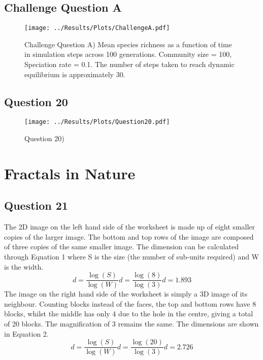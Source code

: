 \documentclass[12pt]{article}
\begin{document}
    \subsection{Challenge Question A}
	\begin{figure}[H]
		\centering
		\texttt{[image: ../Results/Plots/ChallengeA.pdf]}
		\caption{Challenge Question A) Mean species richness as a function of time in simulation steps across 100 generations. Community size = 100, Speciation rate = 0.1. The number of steps taken to reach dynamic equilibrium is approximately 30.}
	\end{figure}

    \subsection{Question 20}
	\begin{figure}[H]
		\centering
		\texttt{[image: ../Results/Plots/Question20.pdf]}
		\caption{Question 20)}
	\end{figure}
	
	\section{Fractals in Nature}
	\subsection{Question 21}
	The 2D image on the left hand side of the worksheet is made up of eight smaller copies of the larger image. The bottom and top rows of the image are composed of three copies of the same smaller image. The dimension can be calculated through Equation 1 where S is the size (the number of sub-units required) and W is the width. 
    \begin{equation}
    	 d = \frac{\log(S)}{\log(W)} 
	   	 d = \frac{\log(8)}{\log(3)} 
	   	 d = 1.893
    \end{equation}
    The image on the right hand side of the worksheet is simply a 3D image of its neighbour. Counting blocks instead of the faces, the top and bottom rows have 8 blocks, whilst the middle has only 4 due to the hole in the centre, giving a total of 20 blocks. The magnification of 3 remains the same. The dimensions are shown in Equation 2.
    \begin{equation}
	    d = \frac{\log(S)}{\log(W)} 
	    d = \frac{\log(20)}{\log(3)} 
	    d = 2.726
    \end{equation}
    
\end{document}
